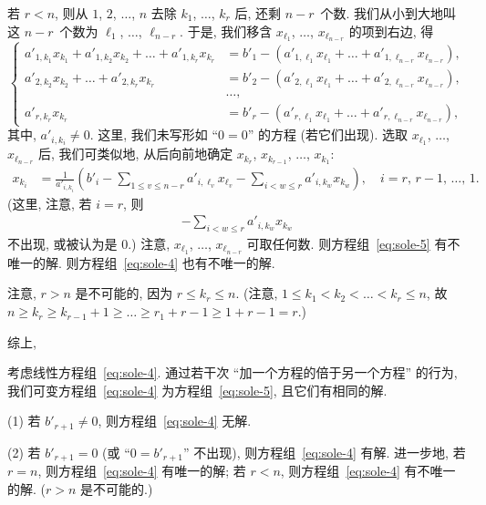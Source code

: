 \documentclass[../libro.tex]{subfiles}
\begin{document}
若 \(r < n\), 则从 \(1\), \(2\), \(\dots\), \(n\)
去除 \(k_1\), \(\dots\), \(k_r\) 后,
还剩 \(n - r\)~个数.
我们从小到大地叫这 \(n - r\)~个数为
\(\ell_1\), \(\dots\), \(\ell_{n-r}\).
于是, 我们移含
\(x_{\ell_1}\), \(\dots\), \(x_{\ell_{n-r}}\) 的项到右边,
得
\begin{equation*}
    \left\{ %
    \begin{aligned}
        a'_{1,k_1} x_{k_1} + a'_{1,k_2} x_{k_2} + \dots + a'_{1,k_r} x_{k_r} & = b'_1 - (a'_{1,\ell_1} x_{\ell_1} + \dots + a'_{1,\ell_{n-r}} x_{\ell_{n-r}}), \\
        a'_{2,k_2} x_{k_2} + \dots + a'_{2,k_r} x_{k_r}                      & = b'_2 - (a'_{2,\ell_1} x_{\ell_1} + \dots + a'_{2,\ell_{n-r}} x_{\ell_{n-r}}), \\
        & \dots, \\
        a'_{r,k_r} x_{k_r}                                                   & = b'_r - (a'_{r,\ell_1} x_{\ell_1} + \dots + a'_{r,\ell_{n-r}} x_{\ell_{n-r}}),
    \end{aligned}
    \right. %
\end{equation*}
其中, \(a'_{i,k_i} \neq 0\).
这里, 我们未写形如 ``\(0 = 0\)'' 的方程 (若它们出现).
选取 \(x_{\ell_1}\), \(\dots\), \(x_{\ell_{n-r}}\) 后,
我们可类似地, 从后向前地确定
\(x_{k_r}\), \(x_{k_{r-1}}\), \(\dots\), \(x_{k_1}\):
\begin{align*}
    x_{k_i} & =
    \frac{1}{a'_{i,k_i}}
    \left(
        b'_i
        - \sum_{1 \leq v \leq n-r} {a'_{i,\ell_v} x_{\ell_v}}
        - \sum_{i < w \leq r} {a'_{i,k_w} x_{k_w}}
    \right),
    \quad
    \text{\(i = r\), \(r - 1\), \(\dots\), \(1\)}.
\end{align*}
(这里, 注意, 若 \(i = r\), 则
    \begin{align*}
        - \sum_{i < w \leq r} {a'_{i,k_w} x_{k_w}}
    \end{align*}
不出现, 或被认为是 \(0\).)
注意, \(x_{\ell_1}\), \(\dots\), \(x_{\ell_{n-r}}\)
可取任何数.
则方程组~\eqref{eq:sole-5} 有不唯一的解.
则方程组~\eqref{eq:sole-4} 也有不唯一的解.

注意, \(r > n\) 是不可能的,
因为 \(r \leq k_r \leq n\).
(注意, \(1 \leq k_1 < k_2 < \dots < k_r \leq n\),
    故 \(n \geq k_r \geq k_{r-1} + 1 \geq \dots \geq r_1 + r-1
\geq 1 + r - 1 = r\).)

综上,

\begin{theorem}
    考虑线性方程组~\eqref{eq:sole-4}.
    通过若干次 ``加一个方程的倍于另一个方程'' 的行为,
    我们可变方程组~\eqref{eq:sole-4}
    为方程组~\eqref{eq:sole-5},
    且它们有相同的解.

    (1)
    若 \(b'_{r+1} \neq 0\),
    则方程组~\eqref{eq:sole-4} 无解.

    (2)
    若 \(b'_{r+1} = 0\)
    (或 ``\(0 = b'_{r+1}\)'' 不出现),
    则方程组~\eqref{eq:sole-4} 有解.
    进一步地,
    若 \(r = n\),
    则方程组~\eqref{eq:sole-4} 有唯一的解;
    若 \(r < n\),
    则方程组~\eqref{eq:sole-4} 有不唯一的解.
    (\(r > n\) 是不可能的.)
\end{theorem}
\end{document}

